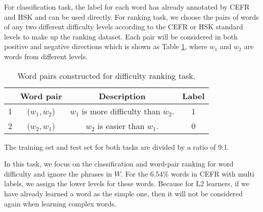 For classification task,  the label for each word has already annotated by CEFR and HSK and can be used directly.
For ranking task, we choose the pairs of words of any two different difficulty levels according to the CEFR or HSK standard levels to make up the ranking dataset.
Each pair will be considered in both positive and negative directions which is shown as Table \ref{tab:pairs}, where $w_1$ and $w_2$ are words from different levels.
\begin{table}[ht]
	\scriptsize
	\setlength{\abovecaptionskip}{0pt}
	\setlength{\belowcaptionskip}{0pt}
	\begin{center}
		\begin{tabular}{cccc}
			\toprule[1pt]
			& \textbf{Word pair} & \textbf{Description} & \textbf{Label} \\ 
			\midrule
			1 & ($w_1, w_2$) & $w_1$ is more difficulty than $w_2$. & 1 \\
			2 & ($w_2, w_1$) & $w_2$ is easier than $w_1$. & 0 \\ 
			\bottomrule[1pt]
		\end{tabular}
	\end{center}
	\caption{\label{tab:pairs} Word pairs constructed for difficulty ranking task.}
\end{table}
The training set and test set for both tasks are divided by a ratio of 9:1.

In this task, we focus on the classification and word-pair ranking for word difficulty and ignore the phrases in $W$.
For the 6.54\% words in CEFR with multi labels, we assign the lower levels for these words.
Because for L2 learners, if we have already learned a word as the simple one, then it will not be considered again when learning complex words.



